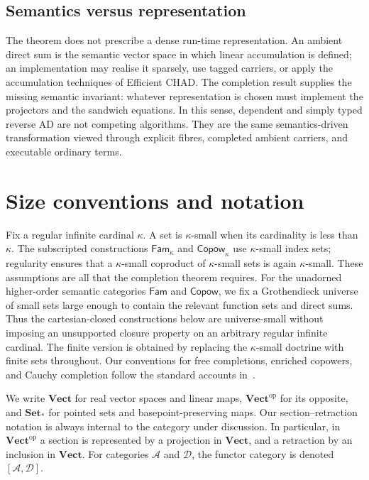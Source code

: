 \documentclass[runningheads,envcountsame]{llncs}
\newcommand{\Setstar}{\mathbf{Set}_{*}}
\newcommand{\Vect}{\mathbf{Vect}}
\newcommand{\Vectop}{\mathbf{Vect}^{\mathrm{op}}}
\newcommand{\Copow}{\mathsf{Copow}}
\newcommand{\Fam}{\mathsf{Fam}}
\begin{document}
\subsection{Semantics versus representation}

The theorem does not prescribe a dense run-time representation.  An ambient
direct sum is the semantic vector space in which linear accumulation is defined;
an implementation may realise it sparsely, use tagged carriers, or apply the
accumulation techniques of Efficient CHAD\@.  The completion result supplies the
missing semantic invariant: whatever representation is chosen must implement
the projectors and the sandwich equations.  In this sense, dependent and simply
typed reverse AD are not competing algorithms.  They are the same
semantics-driven transformation viewed through explicit fibres, completed
ambient carriers, and executable ordinary terms.

\section{Size conventions and notation}
\label{app:size}

Fix a regular infinite cardinal $\kappa$. A set is $\kappa$-small when its cardinality is less than $\kappa$. The subscripted constructions $\Fam_\kappa$ and $\Copow_\kappa$ use $\kappa$-small index sets; regularity ensures that a $\kappa$-small coproduct of $\kappa$-small sets is again $\kappa$-small. These assumptions are all that the completion theorem requires. For the unadorned higher-order semantic categories $\Fam$ and $\Copow$, we fix a Grothendieck universe of small sets large enough to contain the relevant function sets and direct sums. Thus the cartesian-closed constructions below are universe-small without imposing an unsupported closure property on an arbitrary regular infinite cardinal. The finite version is obtained by replacing the $\kappa$-small doctrine with finite sets throughout. Our conventions for free completions, enriched copowers, and Cauchy completion follow the standard accounts in~\cite{Kelly1982,MacLane1998,BorceuxDejean1986}.

We write $\Vect$ for real vector spaces and linear maps, $\Vectop$ for its opposite, and $\Setstar$ for pointed sets and basepoint-preserving maps. Our section--retraction notation is always internal to the category under discussion. In particular, in $\Vectop$ a section is represented by a projection in $\Vect$, and a retraction by an inclusion in $\Vect$. For categories $\mathcal A$ and $\mathcal D$, the functor category is denoted $[\mathcal A,\mathcal D]$.
\end{document}
